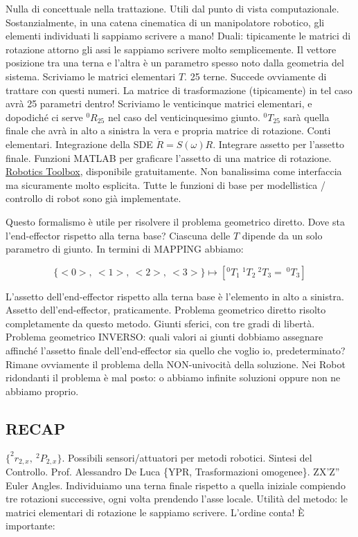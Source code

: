 Nulla di concettuale nella trattazione. Utili dal punto di vista computazionale. Sostanzialmente, in una catena cinematica di un manipolatore robotico, gli elementi individuati li sappiamo scrivere a mano! Duali: tipicamente le matrici di rotazione attorno gli assi le sappiamo scrivere molto semplicemente. Il vettore posizione tra una terna e l'altra è un parametro spesso noto dalla geometria del sistema. Scriviamo le matrici elementari $T$. 25 terne. Succede ovviamente di trattare con questi numeri. La matrice di trasformazione (tipicamente) in tel caso avrà 25 parametri dentro! Scriviamo le venticinque matrici elementari, e dopodiché ci serve $^0R_{25}$ nel caso del venticinquesimo giunto. $^0T_{25}$ sarà quella finale che avrà in alto a sinistra la vera e propria matrice di rotazione. Conti elementari. Integrazione della SDE $\dot{R}=S(\omega)R$. Integrare assetto per l'assetto finale. Funzioni MATLAB per graficare l'assetto di una matrice di rotazione. \underline{Robotics Toolbox}, disponibile gratuitamente. Non banalissima come interfaccia ma sicuramente molto esplicita. Tutte le funzioni di base per modellistica / controllo di robot sono già implementate.

Questo formalismo è utile per risolvere il problema geometrico diretto. Dove sta l'end-effector rispetto alla terna base? Ciascuna delle $T$ dipende da un solo parametro di giunto. In termini di MAPPING abbiamo:

\[
	\{<0>,\ <1>,\ <2>,\ <3>\} \mapsto [^0T_1\ ^1T_2\ ^2T_3 =\ ^0T_3]
\]

L'assetto dell'end-effector rispetto alla terna base è l'elemento in alto a sinistra. Assetto dell'end-effector, praticamente. Problema geometrico diretto risolto completamente da questo metodo. Giunti sferici, con tre gradi di libertà. Problema geometrico INVERSO: quali valori ai giunti dobbiamo assegnare affinché l'assetto finale dell'end-effector sia quello che voglio io, predeterminato? Rimane ovviamente il problema della NON-univocità della soluzione. Nei Robot ridondanti il problema è mal posto: o abbiamo infinite soluzioni oppure non ne abbiamo proprio.

\subsection{RECAP}

$\{^2r_{2,x},\ ^2P_{2,x}\}$. Possibili sensori/attuatori per metodi robotici. Sintesi del Controllo. Prof. Alessandro De Luca \{YPR, Trasformazioni omogenee\}. ZX'Z'' Euler Angles. Individuiamo una terna finale rispetto a quella iniziale compiendo tre rotazioni successive, ogni volta prendendo l'asse locale. Utilità del metodo: le matrici elementari di rotazione le sappiamo scrivere. L'ordine conta! \`E importante:

